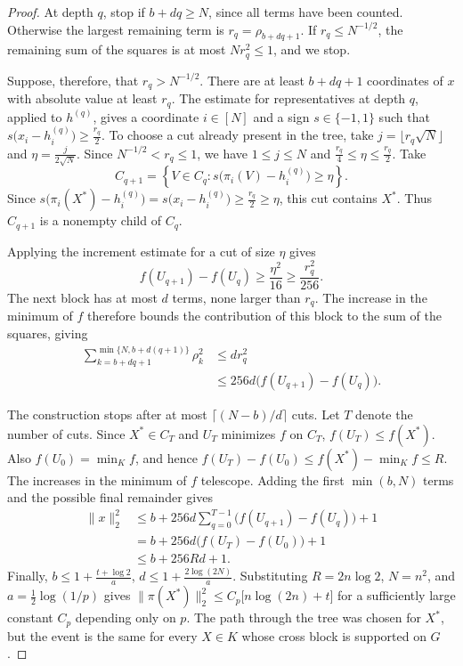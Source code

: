 \documentclass[11pt]{article}
\numberwithin{equation}{section}
\theoremstyle{definition}
\theoremstyle{remark}
\begin{document}
\begin{proof}
At depth $q$, stop if $b+dq\geq N$, since all terms have been
counted. Otherwise the largest remaining term is $r_q=\rho_{b+dq+1}$.
If $r_q\leq N^{-1/2}$, the remaining sum of the squares is at most
$Nr_q^2\leq1$, and we stop.

Suppose, therefore, that $r_q>N^{-1/2}$. There are at least
$b+dq+1$ coordinates of $x$ with absolute value at least $r_q$.
The estimate for representatives at depth $q$, applied to $h^{(q)}$,
gives a coordinate $i\in[N]$ and a sign $s\in\{-1,1\}$ such that
$s\bigl(x_i-h_i^{(q)}\bigr)\geq\frac{r_q}{2}$.
To choose a cut already present in the tree, take
$j=\lfloor r_q\sqrt N\rfloor$ and $\eta=\frac{j}{2\sqrt N}$.
Since $N^{-1/2}<r_q\leq1$, we have
$1\leq j\leq N$ and $\frac{r_q}{4}\leq\eta\leq\frac{r_q}{2}$.
Take
\[
 C_{q+1}
 =
 \left\{
 V\in C_q:
 s\bigl(\pi_i(V)-h_i^{(q)}\bigr)\geq\eta
 \right\}.
\]
Since $s\bigl(\pi_i(X^*)-h_i^{(q)}\bigr) =s\bigl(x_i-h_i^{(q)}\bigr) \geq\frac{r_q}{2}\geq\eta$,
this cut contains $X^*$. Thus $C_{q+1}$ is a nonempty child of $C_q$.

Applying the increment estimate for a cut of size $\eta$ gives
\[
 f(U_{q+1})-f(U_q)
 \geq\frac{\eta^2}{16}
 \geq\frac{r_q^2}{256}.
\]
The next block has at most $d$ terms, none larger than $r_q$.
The increase in the minimum of $f$ therefore bounds the contribution
of this block to the sum of the squares, giving
\[
 \begin{aligned}
 \sum_{k=b+dq+1}^{\min\{N,b+d(q+1)\}}\rho_k^2
 &\leq d r_q^2\\
 &\leq256d\bigl(f(U_{q+1})-f(U_q)\bigr).
 \end{aligned}
\]

The construction stops after at most
$\lceil (N-b)/d\rceil$ cuts. Let $T$ denote the number of cuts.
Since $X^*\in C_T$ and $U_T$ minimizes $f$ on $C_T$,
$f(U_T)\leq f(X^*)$.
Also $f(U_0)=\min_K f$, and hence
$f(U_T)-f(U_0) \leq f(X^*)-\min_K f \leq R$.
The increases in the minimum of $f$ telescope. Adding the first
$\min(b,N)$ terms and the possible final remainder gives
\[
 \begin{aligned}
 \|x\|_2^2
 &\leq b+
 256d\sum_{q=0}^{T-1}
 \bigl(f(U_{q+1})-f(U_q)\bigr)+1\\
 &=b+256d\bigl(f(U_T)-f(U_0)\bigr)+1\\
 &\leq b+256Rd+1.
 \end{aligned}
\]
Finally,
$b\leq1+\frac{t+\log2}{a}$, $d\leq1+\frac{2\log(2N)}a$.
Substituting $R=2n\log2$, $N=n^2$, and $a=\tfrac12\log(1/p)$ gives
$\|\pi(X^*)\|_2^2\leq C_p\bigl[n\log(2n)+t\bigr]$
for a sufficiently large constant $C_p$ depending only on $p$.
The path through the tree was chosen for $X^*$, but the event is the
same for every $X\in K$ whose cross block is supported on $G$.
\end{proof}
\end{document}
